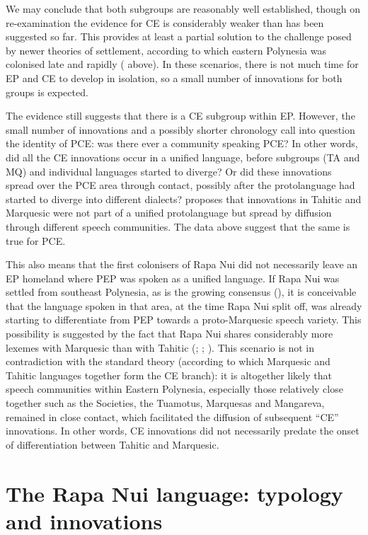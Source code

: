 We may conclude that both subgroups are reasonably well established, though on re-examination the evidence for CE is considerably weaker than has been suggested so far. This provides at least a partial solution to the challenge posed by newer theories of settlement, according to which eastern Polynesia was colonised late and rapidly ( above). In these scenarios, there is not much time for EP and CE to develop in isolation, so a small number of innovations for both groups is expected.

The evidence still suggests that there is a CE subgroup within EP. However, the small number of innovations and a possibly shorter chronology call into question the identity of PCE: was there ever a community speaking PCE? In other words, did all the CE innovations occur in a unified language, before subgroups (TA and MQ) and individual languages started to diverge? Or did these innovations spread over the PCE area through contact, possibly after the protolanguage had started to diverge into different dialects? \citet{Walworth2012} proposes that innovations in Tahitic and Marquesic were not part of a unified protolanguage but spread by diffusion through different speech communities. The data above suggest that the same is true for PCE. 

This also means that the first colonisers of Rapa Nui did not necessarily leave an EP homeland where PEP was spoken as a unified language. If Rapa Nui was settled from southeast Polynesia, as is the growing consensus (), it is conceivable that the language spoken in that area, at the time Rapa Nui split off, was already starting to differentiate from PEP towards a proto-Marquesic speech variety. This possibility is suggested by the fact that Rapa Nui shares considerably more lexemes with Marquesic than with Tahitic (\citealt[94]{Emory1963}; \citealt[42–44]{LangdonTryon1983}; \citealt[424]{Clark1983Review}). This scenario is not in contradiction with the standard theory (according to which Marquesic and Tahitic languages together form the CE branch): it is altogether likely that speech communities within Eastern Polynesia, especially those relatively close together such as the Societies, the Tuamotus, Marquesas and Mangareva, remained in close contact, which facilitated the diffusion of subsequent “CE” innovations. In other words, CE innovations did not necessarily predate the onset of differentiation between Tahitic and Marquesic.
\section{The Rapa Nui language: typology and innovations}\label{sec:1.3}
